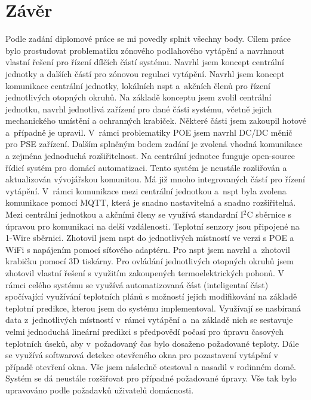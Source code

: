 \chapter{Závěr}
Podle zadání diplomové práce se mi povedly splnit všechny body. Cílem práce bylo prostudovat problematiku zónového podlahového vytápění a navrhnout vlastní řešení pro řízení dílčích částí systému. Navrhl jsem koncept centrální jednotky a dalších částí pro zónovou regulaci vytápění. Navrhl jsem koncept komunikace centrální jednotky, lokálních \acrshort{nspt} a~akčních členů pro řízení jednotlivých otopných okruhů. Na základě konceptu jsem zvolil centrální jednotku, navrhl jednotlivá zařízení pro dané části systému, včetně jejich mechanického umístění a ochranných krabiček. Některé části jsem zakoupil hotové a~případně je upravil. V~rámci problematiky POE jsem navrhl DC/DC měnič pro PSE zařízení. Dalším splněným bodem zadání je zvolená vhodná komunikace a zejména jednoduchá rozšiřitelnost. Na centrální jednotce funguje open-source řídicí systém pro domácí automatizaci. Tento systém je neustále rozšiřován a aktualizován vývojářskou komunitou. Má již mnoho integrovaných částí pro řízení vytápění. V~rámci komunikace mezi centrální jednotkou a~\acrshort{nspt} byla zvolena komunikace pomocí MQTT, která je snadno nastavitelná a snadno rozšiřitelná. Mezi centrální jednotkou a akčními členy se využívá standardní I$^2$C sběrnice s úpravou pro komunikaci na delší vzdálenosti. Teplotní senzory jsou připojené na 1-Wire sběrnici. Zhotovil jsem \acrshort{nspt} do jednotlivých místností ve verzi s POE a WiFi s napájením pomocí síťového adaptéru. Pro \acrshort{nspt} jsem navrhl a~zhotovil krabičku pomocí 3D tiskárny. Pro ovládání jednotlivých otopných okruhů jsem zhotovil vlastní řešení s využitím zakoupených termoelektrických pohonů. V rámci celého systému se využívá automatizovaná část (inteligentní část) spočívající využívání teplotních plánů s možností jejich modifikování na základě teplotní predikce, kterou jsem do systému implementoval. Využívají se nasbíraná data z~jednotlivých místností v~rámci vytápění a~na základě nich se sestavuje velmi jednoduchá lineární predikci s předpovědí počasí pro úpravu časových teplotních úseků, aby v~požadovaný čas bylo dosaženo požadované teploty. Dále se využívá softwarová detekce otevřeného okna pro pozastavení vytápění v případě otevření okna. Vše jsem následně otestoval a nasadil v rodinném domě. Systém se dá neustále rozšiřovat pro případné požadované úpravy. Vše tak bylo upravováno podle požadavků uživatelů domácnosti. 

